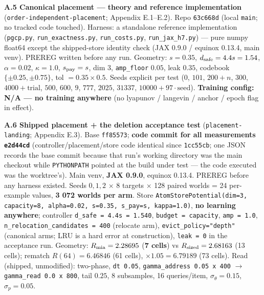 \documentclass{article}
\begin{document}
\textbf{A.5 Canonical placement --- theory and reference implementation} (\texttt{order-independent-placement}; Appendix E.1--E.2). Repo \texttt{63c668d} (local \texttt{main}; no tracked code touched). Harness: a standalone reference implementation (\texttt{pgcp.py}, \texttt{run\_exactness.py}, \texttt{run\_costs.py}, \texttt{run\_jax\_h7.py}) --- pure numpy float64 except the shipped-store identity check (JAX 0.9.0 / equinox 0.13.4, main venv). PREREG written before any run. Geometry: $s=0.35$, $d_{\rm safe}=4.4s=1.54$, $\alpha=0.02$, $\kappa=1.0$, $s_{\rm pay}=s$, dim $3$, \texttt{amp\_floor} $0.05$, leak $0.35$, codebook $\{\pm0.25,\pm0.75\}$, tol $=0.35\times0.5$. Seeds explicit per test ($0$, $101$, $200+n$, $300$, $4000+\text{trial}$, $500$, $600$, $9$, $777$, $2025$, $31337$, $10000+97\cdot\text{seed}$). \textbf{Training config: N/A --- no training anywhere} (no lyapunov / langevin / anchor / epoch flag in effect).

\textbf{A.6 Shipped placement + the deletion acceptance test} (\texttt{placement-landing}; Appendix E.3). Base \texttt{ff85573}; \textbf{code commit for all measurements \texttt{e2d44cd}} (controller/placement/store code identical since \texttt{1cc55cb}; one JSON records the base commit because that run's working directory was the main checkout while \texttt{PYTHONPATH} pointed at the build under test --- the code executed was the worktree's). Main venv, \textbf{JAX 0.9.0}, equinox 0.13.4. PREREG before any harness existed. Seeds $0,1,2$ $\times$ 8 targets $\times$ 128 paired worlds = 24 per-example values, \textbf{3 072 worlds per arm}. Store \texttt{AtomStorePotential(dim=3, capacity=8, alpha=0.02, s=0.35, s\_pay=s, kappa=1.0)}, \textbf{no learning anywhere}; controller \texttt{d\_safe = 4.4s = 1.540}, \texttt{budget = capacity}, \texttt{amp = 1.0}, \texttt{n\_relocation\_candidates = 400} (relocate arm), \texttt{evict\_policy="depth"} (canonical arms; LRU is a hard error at construction), \texttt{leak = 0} in the acceptance run. Geometry: $R_{\rm mia}=2.28695$ (\textbf{7 cells}) vs $R_{\rm sized}=2.68163$ (13 cells); rematch $R(64)=6.46846$ (61 cells), $\times1.05=6.79189$ (73 cells). Read (shipped, unmodified): two-phase, \texttt{dt 0.05}, \texttt{gamma\_address 0.05 x 400} $\to$ \texttt{gamma\_read 0.0 x 800}, tail $0.25$, 8 subsamples, 16 queries/item, $\sigma_\theta=0.15$, $\sigma_p=0.05$.
\end{document}
